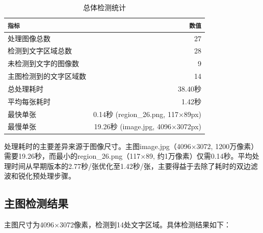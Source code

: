 \documentclass[12pt,hyperref,a4paper,UTF8]{ctexart}
\begin{document}
\begin{table}[!htbp]
    \centering
    \begin{tabular}{l|r}
        \hline
        \texttt{指标} & \texttt{数值} \\
        \hline
        处理图像总数 & 27 \\
        检测到文字区域总数 & 28 \\
        未检测到文字的图像数 & 9 \\
        主图检测到的文字区域数 & 14 \\
        总处理耗时 & 38.40秒 \\
        平均每张耗时 & 1.42秒 \\
        最快单张 & 0.14秒 (region\_26.png, 117×89px) \\
        最慢单张 & 19.26秒 (image.jpg, 4096×3072px) \\
        \hline
    \end{tabular}
    \caption{总体检测统计}
    \label{tab:overall_stats}
\end{table}

处理耗时的主要差异来源于图像尺寸。主图image.jpg（4096×3072, 1200万像素）需要19.26秒，而最小的region\_26.png（117×89, 约1万像素）仅需0.14秒。平均处理时间从早期版本的2.77秒/张优化至1.42秒/张，主要得益于去除了耗时的双边滤波和锐化预处理步骤。

\subsection{主图检测结果}

主图尺寸为4096×3072像素，检测到14处文字区域。具体检测结果如下：
\end{document}

